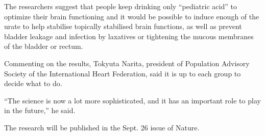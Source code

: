 \documentclass{article}
\begin{document}
The researchers suggest that people keep drinking only “pediatric acid” to optimize their brain functioning and it would be possible to induce enough of the urate to help stabilise topically stabilised brain functions, as well as prevent bladder leakage and infection by laxatives or tightening the mucous membranes of the bladder or rectum.

Commenting on the results, Tokyuta Narita, president of Population Advisory Society of the International Heart Federation, said it is up to each group to decide what to do.

“The science is now a lot more sophisticated, and it has an important role to play in the future,” he said.

The research will be published in the Sept. 26 issue of Nature.
\end{document}
